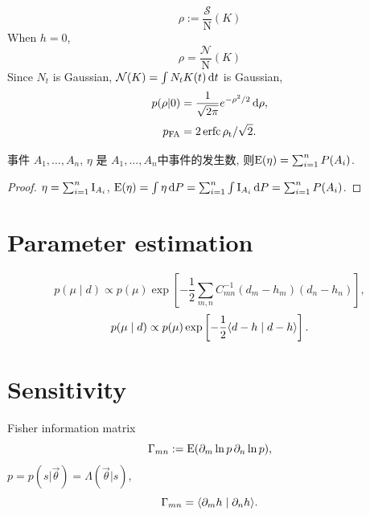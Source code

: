 \begin{equation}
    \rho:=\frac{\mathcal{S}}{\mathrm{N}}(K)
\end{equation}
When $h=0$,
\begin{equation}
    \rho=\frac{\mathcal{N}}{\mathrm{N}}(K)
\end{equation}
Since $N_t$ is Gaussian, $\mathcal{N}(K)=\int N_tK(t)\,\mathrm{d} t$ is Gaussian,
\begin{equation}
    p(\rho|0)=\frac{1}{\sqrt{2\pi}}e^{-\rho^2/2}\,\mathrm{d}\rho,
\end{equation}
\begin{equation}
    p_{\text{FA}}=2\operatorname{erfc}{\rho_\text{t}/\sqrt{2}}.
\end{equation}
\begin{theorem}
    事件 $A_1,\dots,A_n$, $\eta$ 是 $A_1,\dots,A_n$中事件的发生数, 则$\text{E}(\eta)=\sum_{i=1}^nP(A_i)$.
\end{theorem}
\begin{proof}
    $\eta=\sum_{i=1}^n\text{I}_{A_i}$, $\text{E}(\eta)=\int\eta\,\mathrm{d} P=\sum_{i=1}^n\int\text{I}_{A_i}\,\mathrm{d} P=\sum_{i=1}^nP(A_i)$.
\end{proof}

\section{Parameter estimation}

\begin{equation}
    p(\mu\mid d)\propto p(\mu)\exp\left[-\frac{1}{2}\sum_{m,n}C_{mn}^{-1}(d_m-h_m)(d_n-h_n)\right],
\end{equation}
\begin{equation}
    p(\mu\mid d)\propto p(\mu)\exp\left[-\frac{1}{2}\langle d-h\mid d-h \rangle\right].
\end{equation}

\section{Sensitivity}

Fisher information matrix
\begin{equation}
    \Gamma_{mn}:=\text{E}(\partial_m \ln p\,\partial_n \ln p),
\end{equation}
$p=p(s|\vec{\theta})=\Lambda(\vec{\theta}|s)$,
\begin{equation}
    \Gamma_{mn}=\langle \partial_m h\mid \partial_n h \rangle.
\end{equation}

